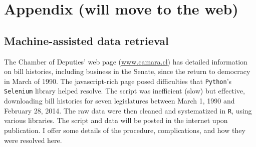 \documentclass[letter,12pt]{article}
\begin{document}
\section{Appendix (will move to the web)}

\subsection{Machine-assisted data retrieval}

The Chamber of Deputies' web page (\url{www.camara.cl}) has detailed information on bill histories, including business in the Senate, since the return to democracy in March of 1990. The javascript-rich page posed difficulties that \texttt{Python}'s \texttt{Selenium} library helped resolve. The script was inefficient (slow) but effective, downloading bill histories for seven legislatures between March 1, 1990 and February 28, 2014. The raw data were then cleaned and systematized in \texttt{R}, using various libraries. The script and data will be posted in the internet upon publication. I offer some details of the procedure, complications, and how they were resolved here. 
\end{document}
